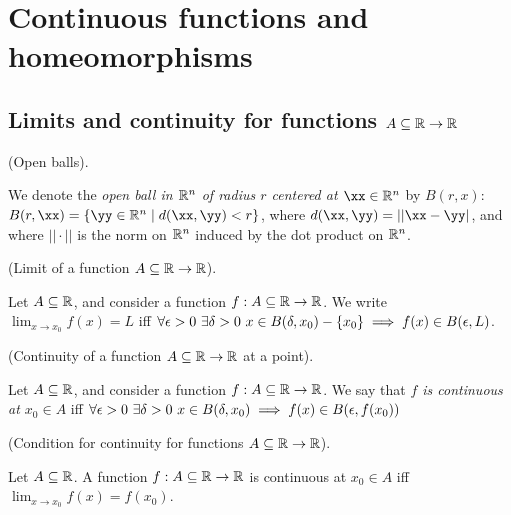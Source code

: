 \newpage

\section{Continuous functions and homeomorphisms}

\subsection*{Limits and continuity for functions $A \subseteq \mathbb{R} \rightarrow \mathbb{R}$}

\begin{defn}
    (Open balls).
    
    We denote the \textit{open ball in $\mathbb{R}^n$ of radius $r$ centered at $\xx \in \R^n$} by $B(r, x)$: ${B(r, \xx) = \{\yy \in \R^n \mid d(\xx, \yy) < r\}}$, where $d(\xx, \yy) = ||\xx - \yy|$, and where $||\cdot||$ is the norm on $\mathbb{R}^n$ induced by the dot product on $\mathbb{R}^n$.
\end{defn}

\begin{defn}
    (Limit of a function $A \subseteq \mathbb{R} \rightarrow \mathbb{R}$).
    
    Let $A \subseteq \mathbb{R}$, and consider a function $f:A \subseteq \mathbb{R} \rightarrow \mathbb{R}$. We write $\lim_{x \rightarrow x_0} f(x) = L$ iff $\forall \epsilon > 0 \text{ } \exists \delta > 0 \text{ } x \in B(\delta, x_0) - \{x_0\} \implies f(x) \in B(\epsilon, L)$.
\end{defn}

\begin{defn}
    (Continuity of a function $A \subseteq \mathbb{R} \rightarrow \mathbb{R}$ at a point).
    
    Let $A \subseteq \mathbb{R}$, and consider a function $f:A \subseteq \mathbb{R} \rightarrow \mathbb{R}$. We say that \textit{$f$ is continuous at $x_0 \in A$} iff $\forall \epsilon > 0 \text{ } \exists \delta > 0 \text{ } x \in B(\delta, x_0) \implies f(x) \in B(\epsilon, f(x_0))$
\end{defn}

\begin{theorem}
    (Condition for continuity for functions $A \subseteq \mathbb{R} \rightarrow \mathbb{R}$).
    
    Let $A \subseteq \mathbb{R}$. A function $f:A \subseteq \mathbb{R} \rightarrow \mathbb{R}$ is continuous at $x_0 \in A$ iff $\lim_{x \rightarrow x_0} f(x) = f(x_0)$.
\end{theorem}


